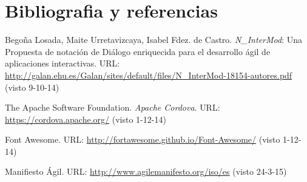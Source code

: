 \chapter*{Bibliografia y referencias}\label{bibliografia}

\begin{enumerate}[label={[\arabic*]}]
\item \label{n-intermod} 
Begoña Losada, Maite Urretavizcaya, Isabel Fdez. de Castro. \textit{N\_InterMod}: Una Propuesta de notación de Diálogo enriquecida para el desarrollo ágil de aplicaciones interactivas. {\small URL:} \url{http://galan.ehu.es/Galan/sites/default/files/N\_InterMod-18154-autores.pdf} (visto 9-10-14)

\item \label{apache-cordova} 
The Apache Software Foundation. \textit{Apache Cordova}. {\small URL:} \url{https://cordova.apache.org/} (visto 1-12-14)

\item \label{font-awesome} 
Font Awesome. {\small URL:} \url{http://fortawesome.github.io/Font-Awesome/} (visto 1-12-14)

\item \label{manifiesto-agil} 
Manifiesto Ágil. {\small URL:} \url{http://www.agilemanifesto.org/iso/es} (visto 24-3-15)
\end{enumerate}

